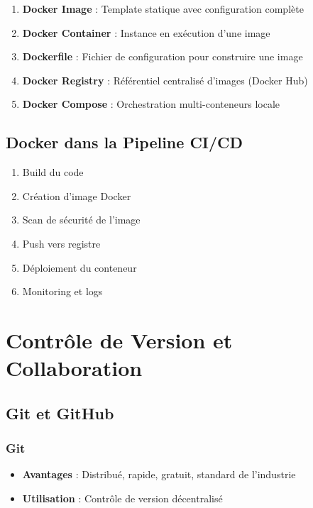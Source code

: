 \documentclass[12pt,a4paper]{report}
\begin{document}
\begin{enumerate}
    \item \textbf{Docker Image} : Template statique avec configuration complète
    \item \textbf{Docker Container} : Instance en exécution d'une image
    \item \textbf{Dockerfile} : Fichier de configuration pour construire une image
    \item \textbf{Docker Registry} : Référentiel centralisé d'images (Docker Hub)
    \item \textbf{Docker Compose} : Orchestration multi-conteneurs locale
\end{enumerate}

\subsection{Docker dans la Pipeline CI/CD}

\begin{enumerate}
    \item Build du code
    \item Création d'image Docker
    \item Scan de sécurité de l'image
    \item Push vers registre
    \item Déploiement du conteneur
    \item Monitoring et logs
\end{enumerate}

\section{Contrôle de Version et Collaboration}

\subsection{Git et GitHub}

\subsubsection{Git}

\begin{itemize}
    \item \textbf{Avantages} : Distribué, rapide, gratuit, standard de l'industrie
    \item \textbf{Utilisation} : Contrôle de version décentralisé
\end{itemize}
\end{document}
